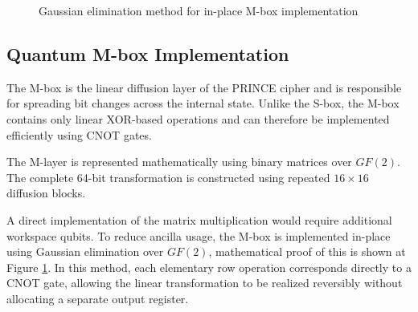 \documentclass[12pt,a4paper]{report}
\begin{document}
\begin{figure}[h]
\centering
{}
\caption{Gaussian elimination method for in-place M-box implementation}
\label{fig:gaussian_mbox}
\end{figure}


\subsection{Quantum M-box Implementation}

The M-box is the linear diffusion layer of the PRINCE cipher and is responsible for spreading bit changes across the internal state. Unlike the S-box, the M-box contains only linear XOR-based operations and can therefore be implemented efficiently using CNOT gates. 

The M-layer is represented mathematically using binary matrices over $GF(2)$. The complete 64-bit transformation is constructed using repeated $16 \times 16$ diffusion blocks. 


A direct implementation of the matrix multiplication would require additional workspace qubits. To reduce ancilla usage, the M-box is implemented in-place using Gaussian elimination over $GF(2)$, mathematical proof of this is shown at Figure \ref{fig:gaussian_mbox}. In this method, each elementary row operation corresponds directly to a CNOT gate, allowing the linear transformation to be realized reversibly without allocating a separate output register.
\end{document}
